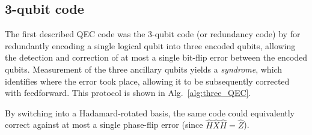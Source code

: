%
%

\subsection{3-qubit code}

The first described QEC code was the 3-qubit code (or redundancy code) by \cite{bib:Shor95} for redundantly encoding a single logical qubit into three encoded qubits, allowing the detection and correction of at most a single bit-flip error between the encoded qubits. Measurement of the three ancillary qubits yields a \textit{syndrome}, which identifies where the error took place, allowing it to be subsequently corrected with feedforward. This protocol is shown in Alg.~\ref{alg:three_QEC}.

By switching into a Hadamard-rotated basis, the same code could equivalently correct against at most a single phase-flip error (since \mbox{$\hat{H}\hat{X}\hat{H}=\hat{Z}$}).

